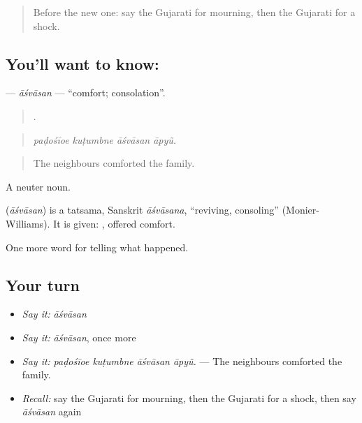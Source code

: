 \label{lesson:GU-C298-asvasan}



\begin{quote}
Before the new one: say the Gujarati for mourning, then the Gujarati for a shock.
\end{quote}

\subsection*{You'll want to know: }
\textbf{} — \emph{āśvāsan} — \textquotedblleft{}comfort; consolation\textquotedblright{}.

\begin{quote}
   .
\end{quote}

\begin{quote}
\emph{paḍośīoe kuṭumbne āśvāsan āpyũ.}
\end{quote}

\begin{quote}
The neighbours comforted the family.
\end{quote}

A neuter noun.

\begin{cousinweb}
\textbf{} (\emph{āśvāsan}) is a tatsama, Sanskrit \emph{āśvāsana}, \textquotedblleft{}reviving, consoling\textquotedblright{} (Monier-Williams). It is given: \textbf{ }, offered comfort.
\end{cousinweb}

\begin{grammarlens}[title={What you've built}]
One more word for telling what happened.
\end{grammarlens}

\subsection*{Your turn}
\begin{itemize}
\raggedright
  \item \emph{Say it:} \emph{āśvāsan}
  \item \emph{Say it:} \emph{āśvāsan}, once more
  \item \emph{Say it:} \emph{paḍośīoe kuṭumbne āśvāsan āpyũ.} — The neighbours comforted the family.
  \item \emph{Recall:} say the Gujarati for mourning, then the Gujarati for a shock, then say \emph{āśvāsan} again
\end{itemize}

